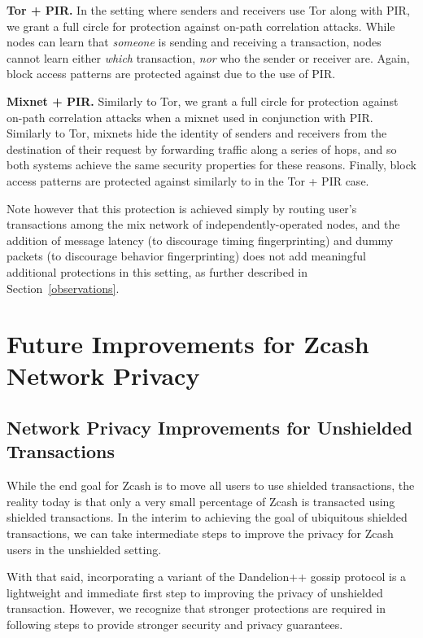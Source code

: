 \documentclass{article}
\begin{document}
\textbf{Tor + PIR.}
In the setting where senders and receivers use Tor along with PIR, we grant a
full circle for protection against on-path correlation
attacks.
While nodes can learn that \emph{someone} is sending and receiving a
transaction, nodes cannot learn either \emph{which} transaction, \emph{nor} who
the sender or receiver are.
Again, block access patterns are protected against due to the use of PIR.

\textbf{Mixnet + PIR.}
Similarly to Tor, we grant a full circle for protection against on-path
correlation attacks when a mixnet used in
conjunction with PIR. Similarly to Tor, mixnets hide the identity of senders
and receivers from the destination of their request by forwarding traffic along
a series of hops, and so both systems achieve the same security properties for
these reasons.
Finally, block access patterns are protected against similarly to in the Tor +
PIR case.

Note however that this protection is
achieved simply by routing user's transactions among the mix network of
independently-operated nodes, and the addition of message latency (to
discourage timing fingerprinting) and dummy packets (to discourage behavior
fingerprinting) does not add meaningful additional protections in this setting,
as further described in Section~\ref{observations}.

\section{Future Improvements for Zcash Network Privacy}
\label{future-improvements}

\subsection{Network Privacy Improvements for Unshielded Transactions}

While the end goal for Zcash is to move all users to use shielded transactions,
the reality today is that only a very small percentage of Zcash is transacted
using shielded transactions. In the interim to achieving the goal of
ubiquitous shielded transactions, we can take intermediate steps to improve
the privacy for Zcash users in the unshielded setting.

With that said, incorporating a variant of the Dandelion++ gossip protocol is a
lightweight and immediate first step to improving the privacy of unshielded
transaction. However, we recognize that stronger protections are required in
following steps to provide stronger security and privacy guarantees.
\end{document}
